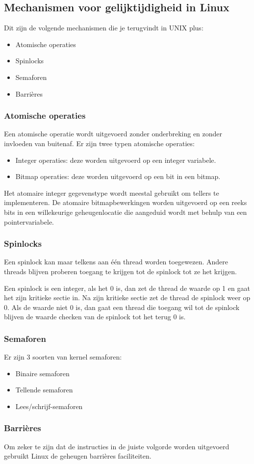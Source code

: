 \subsection{Mechanismen voor gelijktijdigheid in Linux}

Dit zijn de volgende mechanismen die je terugvindt in UNIX plus:

\begin{itemize}
\item Atomische operaties
\item Spinlocks
\item Semaforen
\item Barrières
\end{itemize}

\subsubsection{Atomische operaties}

Een atomische operatie wordt uitgevoerd zonder onderbreking en zonder invloeden van buitenaf. Er zijn twee typen atomische operaties:

\begin{itemize}
\item Integer operaties: deze worden uitgevoerd op een integer variabele.
\item Bitmap operaties: deze worden uitgevoerd op een bit in een bitmap.
\end{itemize}

Het atomaire integer gegevenstype wordt meestal gebruikt om tellers te implementeren. De atomaire bitmapbewerkingen worden uitgevoerd op een reeks bits in een willekeurige geheugenlocatie die aangeduid wordt met behulp van een pointervariabele.

\subsubsection{Spinlocks}

Een spinlock kan maar telkens aan één thread worden toegewezen. Andere threads blijven proberen toegang te krijgen tot de spinlock tot ze het krijgen.

Een spinlock is een integer, als het 0 is, dan zet de thread de waarde op 1 en gaat het zijn kritieke sectie in. Na zijn kritieke sectie zet de thread de spinlock weer op 0.
Als de waarde niet 0 is, dan gaat een thread die toegang wil tot de spinlock blijven de waarde checken van de spinlock tot het terug 0 is.


\subsubsection{Semaforen}
Er zijn 3 soorten van kernel semaforen:

\begin{itemize}
\item Binaire semaforen
\item Tellende semaforen
\item Lees/schrijf-semaforen
\end{itemize}




\subsubsection{Barrières}

Om zeker te zijn dat de instructies in de juiste volgorde worden uitgevoerd gebruikt Linux de geheugen barrières faciliteiten.